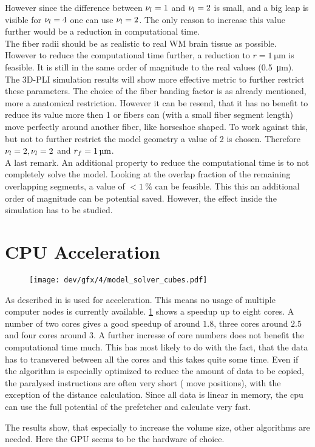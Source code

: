 However since the difference between $\textnormal{$\nu_{l}$}=\SI{1}{}$ and $\textnormal{$\nu_{l}$}=\SI{2}{}$ is small, and a big leap is visible for $\textnormal{$\nu_{l}$}=\SI{4}{}$ one can use $\textnormal{$\nu_{l}$}=\SI{2}{}$.
The only reason to increase this value further would be a reduction in computational time.
\\
% 
The fiber radii should be as realistic to real \acs{WM} brain tissue as possible.
However to reduce the computational time further, a reduction to $r = \SI{1}{\micro\meter}$ is feasible.
It is still in the same order of magnitude to the real values (\SI{0.5}{\micro\meter}).
The \ac{3D-PLI} simulation results will show more effective metric to further restrict these parameters.
% 
The choice of the fiber banding factor is as already mentioned, more a anatomical restriction.
However it can be resend, that it has no benefit to reduce its value more then 1 or fibers can (with a small fiber segment length) move perfectly around another fiber, like horseshoe shaped.
To work against this, but not to further restrict the model geometry a value of 2 is chosen.
Therefore $\textnormal{$\nu_{l}$} = \SI{2}{}, \textnormal{$\nu_{l}$}=\SI{2}{}$ and $\fiberRadius=\SI{1}{\micro\meter}$.
\\
% 
A last remark.
An additional property to reduce the computational time is to not completely solve the model. 
Looking at the overlap fraction of the remaining overlapping segments, a value of $<\SI{1}{\percent}$ can be feasible.
This this an additional order of magnitude can be potential saved.
However, the effect inside the simulation has to be studied.
% 
\section{CPU Acceleration}
% 
\begin{figure}[!t]
\centering
\texttt{[image: dev/gfx/4/model\_solver\_cubes.pdf]}
\caption[speedup]{ }
\label{fig:solverSpeedup}
\end{figure}
% 
% 
As described in \dummy{} \openmp{} is used for acceleration.
This means no usage of multiple computer nodes is currently available.
\cref{fig:solverSpeedup} shows a speedup up to eight cores.
A number of two cores gives a good speedup of around $1.8$, three cores around $2.5$ and four cores around $3$.
A further incresse of core numbers does not benefit the computational time much.
This has most likely to do with the fact, that the data has to transvered between all the cores and this takes quite some time.
Even if the algorithm is especially optimized to reduce the amount of data to be copied, the paralysed instructions are often very short (\eg{} move positions), with the exception of the distance calculation.
Since all data is linear in memory, the cpu can use the full potential of the prefetcher and calculate very fast.
\par
% 
The results show, that especially to increase the volume size, other algorithms are needed. 
Here the \ac{GPU} seems to be the hardware of choice.
% 
